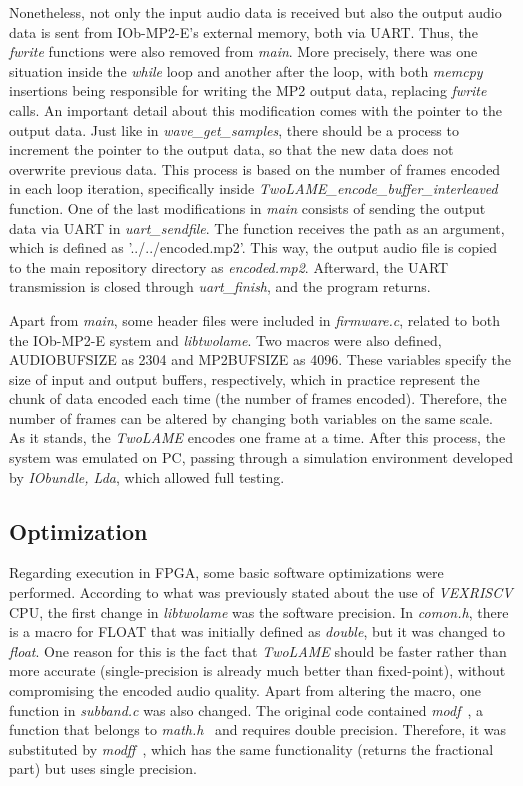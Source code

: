 Nonetheless, not only the input audio data is received but also the output audio data is sent from IOb-MP2-E's external memory, both via UART. Thus, the \textit{fwrite} functions were also removed from \textit{main}.
More precisely, there was one situation inside the \textit{while} loop and another after the loop, with both \textit{memcpy} insertions being responsible for writing the MP2 output data, replacing \textit{fwrite} calls. An important detail about this modification comes with the pointer to the output data. Just like in \textit{wave\_get\_samples}, there should be a process to increment the pointer to the output data, so that the new data does not overwrite previous data. This process is based on the number of frames encoded in each loop iteration, specifically inside \textit{\textit{TwoLAME}\_encode\_buffer\_interleaved} function.
One of the last modifications in \textit{main} consists of sending the output data via UART in \textit{uart\_sendfile}. The function receives the path as an argument, which is defined as ’../../encoded.mp2’. This way, the output audio file is copied to the main repository directory as \textit{encoded.mp2}.
Afterward, the UART transmission is closed through \textit{uart\_finish}, and the program returns.

Apart from \textit{main}, some header files were included in \textit{firmware.c}, related to both the IOb-MP2-E system and \textit{libtwolame}. Two macros were also defined, AUDIOBUFSIZE as 2304 and MP2BUFSIZE as 4096. These variables specify the size of input and output buffers, respectively, which in practice represent the chunk of data encoded each time (the number of frames encoded). Therefore, the number of frames can be altered by changing both variables on the same scale. As it stands, the \textit{TwoLAME} encodes one frame at a time. 
After this process, the system was emulated on PC, passing through a simulation environment developed by \textit{IObundle, Lda}, which allowed full testing. 

\subsection{Optimization}

Regarding execution in FPGA, some basic software optimizations were performed.
According to what was previously stated about the use of \textit{VEXRISCV} CPU, the first change in \textit{libtwolame} was the software precision. In \textit{comon.h}, there is a macro for FLOAT that was initially defined as \textit{double}, but it was changed to \textit{float}. One reason for this is the fact that \textit{TwoLAME} should be faster rather than more accurate (single-precision is already much better than fixed-point), without compromising the encoded audio quality.
Apart from altering the macro, one function in \textit{subband.c} was also changed. The original code contained \textit{modf}~\cite{modf}, a function that belongs to \textit{math.h}~\cite{mathh} and requires double precision. Therefore, it was substituted by \textit{modff}~\cite{modf}, which has the same functionality (returns the fractional part) but uses single precision.

